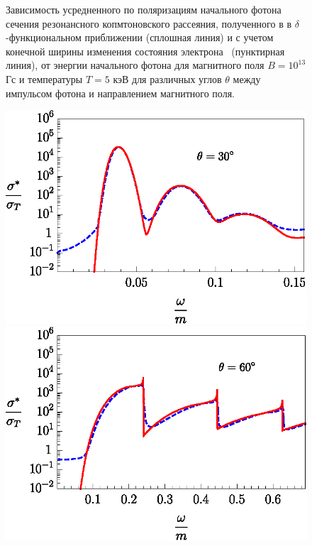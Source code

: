 \documentclass[cp1251%
               ]{jetp} %
\begin{document}
\begin{figure}[t!]
\caption{Зависимость усредненного по поляризациям начального фотона сечения резонансного копмтоновского рассеяния, полученного в в $\delta$-функциональном приближении (сплошная линия) и с учетом конечной ширины изменения состояния электрона~\cite{Harding:1991} (пунктирная линия), от энергии начального фотона для магнитного поля $B = 10^{13}$ Гс и температуры $T=5$ кэВ для различных углов $\theta$ между импульсом фотона и направлением магнитного поля.}
\label{fig1}
\end{figure}
\begin{figure}[t!]\centering
\includegraphics[width=1\linewidth,clip]{fig2_1.eps}
\includegraphics[width=1\linewidth,clip]{fig2_2.eps}

\end{figure}
\end{document}
